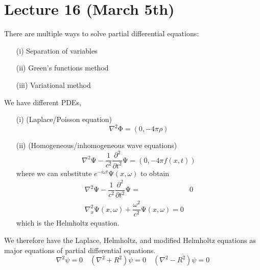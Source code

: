 \section{Lecture 16 (March 5th)}
\begin{rmk}
There are multiple ways to solve partial differential equations:
\begin{itemize}
\item[(i)] Separation of variables
\item[(ii)] Green's functions method
\item[(iii)] Variational method 
\end{itemize}
\end{rmk}
\vspace{2ex}
\begin{ex}
We have different PDEs, 
\begin{itemize}
\item[(i)] (Laplace/Poisson equation) \[\nabla ^2\mathrm{\Phi} =(0,-4\pi \rho )\]
\item[(ii)] (Homogeneous/inhomogeneous wave equations) \[\nabla ^2\mathrm{\Psi} -\dfrac{1}{c^2}\dfrac{\partial ^2}{\partial t^2}\mathrm{\Psi} =(0,-4\pi f(x,t)) \]
where we can substitute $e^{-i\omega t}\mathrm{\Psi} (x,\omega )$ to obtain
\begin{align*}
\nabla^2 \mathrm{\Psi} -\dfrac{1}{c^2}\dfrac{\partial ^2}{\partial t^2}\mathrm{\Psi} =&0\\
\nabla ^2_{x}\mathrm{\Psi} (x,\omega )+\dfrac{\omega ^2}{c^2}\mathrm{\Psi} (x,\omega )=0
\end{align*}
which is the Helmholtz equation. 
\end{itemize}
We therefore have the Laplace, Helmholtz, and modified Helmholtz equations as major equations of partial differential equations.
\[\nabla ^2\psi =0\quad (\nabla ^2+R^2)\psi =0\quad (\nabla ^2-R^2)\psi =0\]
\end{ex}
\vspace{2ex}
